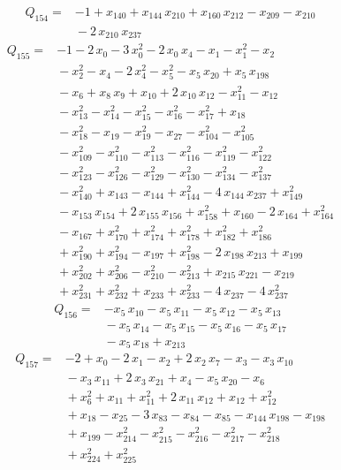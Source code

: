 \documentclass[11pt]{article}
\theoremstyle{definition}\newtheorem{definition}[theorem]{Definition}
\begin{document}
\begin{align*}
Q_{154}={}&-1+x_{140}+x_{144}\,x_{210}+x_{160}\,x_{212}-x_{209}-x_{210}
\\ &{}-2\,x_{210}\,x_{237}
\end{align*}
\begin{align*}
Q_{155}={}&-1-2\,x_{0}-3\,x_{0}^{2}-2\,x_{0}\,x_{4}-x_{1}-x_{1}^{2}-x_{2}
\\ &{}-x_{2}^{2}-x_{4}-2\,x_{4}^{2}-x_{5}^{2}-x_{5}\,x_{20}+x_{5}\,x_{198}
\\ &{}-x_{6}+x_{8}\,x_{9}+x_{10}+2\,x_{10}\,x_{12}-x_{11}^{2}-x_{12}
\\ &{}-x_{13}^{2}-x_{14}^{2}-x_{15}^{2}-x_{16}^{2}-x_{17}^{2}+x_{18}
\\ &{}-x_{18}^{2}-x_{19}-x_{19}^{2}-x_{27}-x_{104}^{2}-x_{105}^{2}
\\ &{}-x_{109}^{2}-x_{110}^{2}-x_{113}^{2}-x_{116}^{2}-x_{119}^{2}-x_{122}^{2}
\\ &{}-x_{123}^{2}-x_{126}^{2}-x_{129}^{2}-x_{130}^{2}-x_{134}^{2}-x_{137}^{2}
\\ &{}-x_{140}^{2}+x_{143}-x_{144}+x_{144}^{2}-4\,x_{144}\,x_{237}+x_{149}^{2}
\\ &{}-x_{153}\,x_{154}+2\,x_{155}\,x_{156}+x_{158}^{2}+x_{160}-2\,x_{164}+x_{164}^{2}
\\ &{}-x_{167}+x_{170}^{2}+x_{174}^{2}+x_{178}^{2}+x_{182}^{2}+x_{186}^{2}
\\ &{}+x_{190}^{2}+x_{194}^{2}-x_{197}+x_{198}^{2}-2\,x_{198}\,x_{213}+x_{199}
\\ &{}+x_{202}^{2}+x_{206}^{2}-x_{210}^{2}-x_{213}^{2}+x_{215}\,x_{221}-x_{219}
\\ &{}+x_{231}^{2}+x_{232}^{2}+x_{233}+x_{233}^{2}-4\,x_{237}-4\,x_{237}^{2}
\end{align*}
\begin{align*}
Q_{156}={}&-x_{5}\,x_{10}-x_{5}\,x_{11}-x_{5}\,x_{12}-x_{5}\,x_{13}
\\ &{}-x_{5}\,x_{14}-x_{5}\,x_{15}-x_{5}\,x_{16}-x_{5}\,x_{17}
\\ &{}-x_{5}\,x_{18}+x_{213}
\end{align*}
\begin{align*}
Q_{157}={}&-2+x_{0}-2\,x_{1}-x_{2}+2\,x_{2}\,x_{7}-x_{3}-x_{3}\,x_{10}
\\ &{}-x_{3}\,x_{11}+2\,x_{3}\,x_{21}+x_{4}-x_{5}\,x_{20}-x_{6}
\\ &{}+x_{6}^{2}+x_{11}+x_{11}^{2}+2\,x_{11}\,x_{12}+x_{12}+x_{12}^{2}
\\ &{}+x_{18}-x_{25}-3\,x_{83}-x_{84}-x_{85}-x_{144}\,x_{198}-x_{198}
\\ &{}+x_{199}-x_{214}^{2}-x_{215}^{2}-x_{216}^{2}-x_{217}^{2}-x_{218}^{2}
\\ &{}+x_{224}^{2}+x_{225}^{2}
\end{align*}
\end{document}
